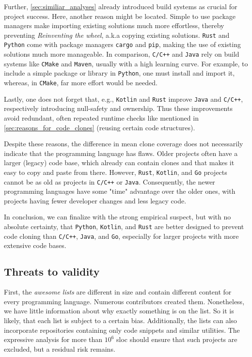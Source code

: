 Further, \autoref{sec:similiar_analyses} already introduced build systems as crucial for project success. Here, another reason might be located. Simple to use package managers make importing existing solutions much more effortless, thereby preventing \textit{Reinventing the wheel}, a.k.a copying existing solutions. \texttt{Rust} and \texttt{Python} come with package managers \texttt{cargo} and \texttt{pip}, making the use of existing solutions much more manageable. In comparison, \texttt{C/C++} and \texttt{Java} rely on build systems like \texttt{CMake} and \texttt{Maven}, usually with a high learning curve. For example, to include a simple package or library in \texttt{Python}, one must install and import it, whereas, in \texttt{CMake}, far more effort would be needed.

Lastly, one does not forget that, e.g., \texttt{Kotlin} and \texttt{Rust} improve \texttt{Java} and \texttt{C/C++}, respectively introducing null-safety and ownership. Thus these improvements avoid redundant, often repeated runtime checks like mentioned in \autoref{sec:reasons_for_code_clones} (reusing certain code structures).

Despite these reasons, the difference in mean clone coverage does not necessarily indicate that the programming language has flaws.
Older projects often have a larger (legacy) code base, which already can contain clones and that makes it easy to copy and paste from there. 
However, \texttt{Rust}, \texttt{Kotlin}, and \texttt{Go} projects cannot be as old as projects in \texttt{C/C++} or \texttt{Java}. Consequently, the newer programming languages have some "time" advantage over the older ones, with projects having fewer developer changes and less legacy code.

In conclusion, we can finalize with the strong empirical suspect, but with no absolute certainty, that \texttt{Python}, \texttt{Kotlin}, and \texttt{Rust} are better designed to prevent code cloning than \texttt{C/C++}, \texttt{Java}, and \texttt{Go}, especially for larger projects with more extensive code bases.

 
\subsection{Threats to validity}

First, the \textit{awesome lists} are different in size and contain different content for every programming language. Numerous contributors created them. Nonetheless, we have little information about why exactly something is on the list. So it is likely, that each list is subject to a certain bias. Additionally, the lists can also incorporate repositories containing only code snippets and similar utilities. The expressive analysis for more than $10^6$ \ac{sloc} should ensure that such projects are excluded, but a residual risk remains.

